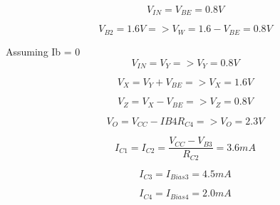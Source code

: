 \documentclass[12pt,a4paper]{article}
\begin{document}
\begin{equation}
  V_{IN} = V_{BE} = 0.8V
\end{equation}

\begin{equation}
  V_{B2} = 1.6V => V_{W} = 1.6 - V_{BE} = 0.8V
\end{equation}

Assuming Ib = 0
\begin{equation}
  V_{IN} = V_{Y} => V_{Y} = 0.8V
\end{equation}

\begin{equation}
  V_{X} = V_{Y} + V_{BE} => V_{X} = 1.6V
\end{equation}

\begin{equation}
  V_{Z} = V_{X} - V_{BE} => V_{Z} = 0.8V
\end{equation}

\begin{equation}
  V_{O} = V_{CC} - I{B4} R_{C4} => V_{O} = 2.3V
\end{equation}

\begin{equation}
  I_{C1} = I_{C2} = \frac{V_{CC} - V_{B3}}{R_{C2}} = 3.6mA
\end{equation}

\begin{equation}
  I_{C3} = I_{Bias3} = 4.5mA
\end{equation}

\begin{equation}
  I_{C4} = I_{Bias4} = 2.0mA
\end{equation}
\end{document}
